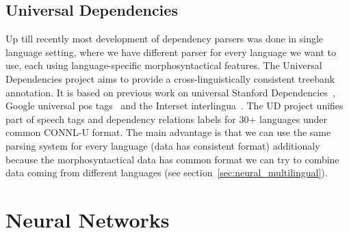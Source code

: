 \subsection{Universal Dependencies}
Up till recently most development of dependency parsers was done in single language
setting, where we have different parser for every language we want to use, each
using language-specific morphosyntactical features. The Universal Dependencies
project \cite{nivre_universal_2015} aims to provide a cross-linguistically consistent
treebank annotation. It is based on previous work on universal Stanford
Dependencies~\cite{marneffe_generating_2006},
Google universal pos tags~\cite{petrov_universal_2011}
and the Interset interlingua~\cite{zeman_reusable_2008}.
The UD project unifies part of speech tags and dependency relations labels
for 30+ languages under common CONNL-U format.
The main advantage is that we can use the same parsing system for every language
(data has consistent format) additionaly because the morphosyntactical data has
common format we can try to combine data coming from different languages (see
section~\ref{sec:neural_multilingual}).

\section{Neural Networks}

